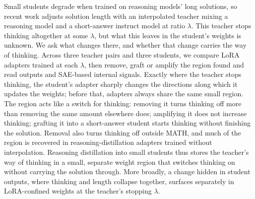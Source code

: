 Small students degrade when trained on reasoning models' long solutions, so recent work adjusts solution length with an interpolated teacher mixing a reasoning model and a short-answer instruct model at ratio $\lambda$. This teacher stops thinking altogether at some $\lambda$, but what this leaves in the student's weights is unknown. We ask what changes there, and whether that change carries the way of thinking. Across three teacher pairs and three students, we compare LoRA adapters trained at each $\lambda$, then remove, graft or amplify the region found and read outputs and SAE-based internal signals. Exactly where the teacher stops thinking, the student's adapter sharply changes the directions along which it updates the weights; before that, adapters always share the same small region. The region acts like a switch for thinking: removing it turns thinking off more than removing the same amount elsewhere does; amplifying it does not increase thinking; grafting it into a short-answer student starts thinking without finishing the solution. Removal also turns thinking off outside MATH, and much of the region is recovered in reasoning-distillation adapters trained without interpolation. Reasoning distillation into small students thus stores the teacher's way of thinking in a small, separate weight region that switches thinking on without carrying the solution through. More broadly, a change hidden in student outputs, where thinking and length collapse together, surfaces separately in LoRA-confined weights at the teacher's stopping $\lambda$.
